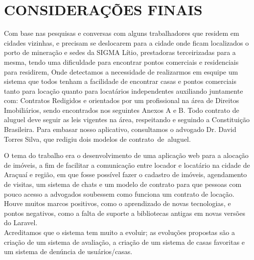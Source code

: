 \chapter{CONSIDERAÇÕES FINAIS}

Com base nas pesquisas e conversas com alguns trabalhadores que residem em cidades vizinhas, e precisam se deslocarem para a cidade onde ficam localizados o porto de mineração e sedes da SIGMA Lítio, prestadoras terceirizadas para a mesma, tendo uma dificuldade para encontrar pontos comerciais e residenciais para residirem, Onde detectamos a necessidade de realizarmos em esquipe um sistema que todos tenham a facilidade de encontrar casas e pontos comerciais tanto para locação quanto para locatários independentes auxiliando juntamente com: Contratos Redigidos e orientados por um profissional na área de Direitos Imobiliários, sendo encontrados nos seguintes Anexos A e B. Todo contrato de aluguel deve seguir as leis vigentes na área, respeitando e seguindo a Constituição Brasileira. Para embasar nosso aplicativo, consultamos o advogado Dr. David Torres Silva, que redigiu dois modelos de contrato de aluguel.

O tema do trabalho era o desenvolvimento de uma aplicação web para a alocação de imóveis, a fim de facilitar a comunicação entre locador e locatário na cidade de Araçuaí e região, em que fosse possível fazer o cadastro de imóveis, agendamento de visitas, um sistema de chats e um modelo de contrato para que pessoas com pouco acesso a advogados soubessem como funciona um contrato de locação. Houve muitos marcos positivos, como o aprendizado de novas tecnologias, e pontos negativos, como a falta de suporte a bibliotecas antigas em novas versões do Laravel.\\

Acreditamos que o sistema tem muito a evoluir; as evoluções propostas são a criação de um sistema de avaliação, a criação de um sistema de casas favoritas e um sistema de denúncia de usuários/casas.






